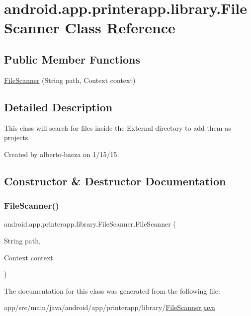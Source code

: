 \hypertarget{classandroid_1_1app_1_1printerapp_1_1library_1_1_file_scanner}{}\section{android.\+app.\+printerapp.\+library.\+File\+Scanner Class Reference}
\label{classandroid_1_1app_1_1printerapp_1_1library_1_1_file_scanner}
\subsection*{Public Member Functions}
\begin{DoxyCompactItemize}
\item 
\hyperlink{classandroid_1_1app_1_1printerapp_1_1library_1_1_file_scanner_ac44e6e63992fbfa44dae816a81944577}{File\+Scanner} (String path, Context context)
\end{DoxyCompactItemize}


\subsection{Detailed Description}
This class will search for files inside the External directory to add them as projects. 

Created by alberto-\/baeza on 1/15/15. 

\subsection{Constructor \& Destructor Documentation}
\mbox{\label{classandroid_1_1app_1_1printerapp_1_1library_1_1_file_scanner_ac44e6e63992fbfa44dae816a81944577}} 
\subsubsection{\texorpdfstring{File\+Scanner()}{FileScanner()}}
{\footnotesize\ttfamily android.\+app.\+printerapp.\+library.\+File\+Scanner.\+File\+Scanner (\begin{DoxyParamCaption}\item[{String}]{path,  }\item[{Context}]{context }\end{DoxyParamCaption})}



The documentation for this class was generated from the following file\+:\begin{DoxyCompactItemize}
\item 
app/src/main/java/android/app/printerapp/library/\hyperlink{_file_scanner_8java}{File\+Scanner.\+java}\end{DoxyCompactItemize}
